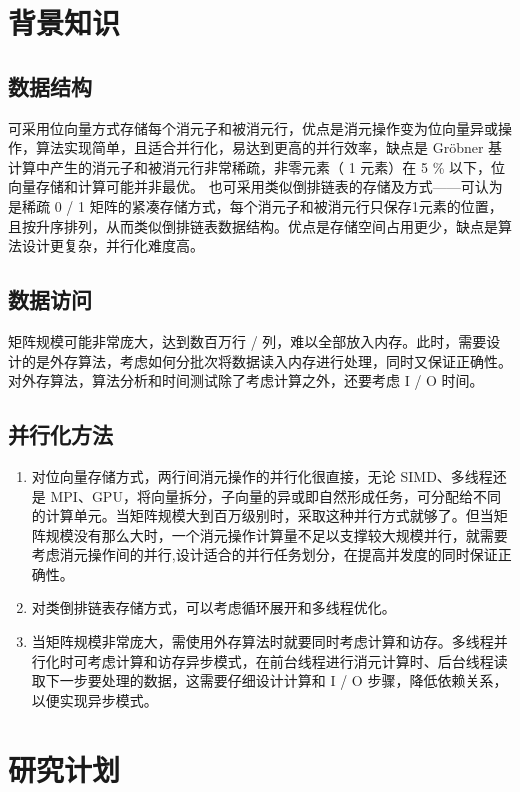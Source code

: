 \documentclass[a4paper]{article}
\begin{document}
\section{背景知识}

\subsection{数据结构}

可采用位向量方式存储每个消元子和被消元行，优点是消元操作变为位向量异或操作，算法实现简单，且适合并行化，易达到更高的并行效率，缺点是 Gröbner 基计算中产生的消元子和被消元行非常稀疏，非零元素（ 1 元素）在 5 \% 以下，位向量存储和计算可能并非最优。
也可采用类似倒排链表的存储及方式——可认为是稀疏 0 / 1 矩阵的紧凑存储方式，每个消元子和被消元行只保存1元素的位置，且按升序排列，从而类似倒排链表数据结构。优点是存储空间占用更少，缺点是算法设计更复杂，并行化难度高。

\subsection{数据访问}

矩阵规模可能非常庞大，达到数百万行 / 列，难以全部放入内存。此时，需要设计的是外存算法，考虑如何分批次将数据读入内存进行处理，同时又保证正确性。对外存算法，算法分析和时间测试除了考虑计算之外，还要考虑 I / O 时间。

\subsection{并行化方法}

\begin{enumerate}
  \item 对位向量存储方式，两行间消元操作的并行化很直接，无论 SIMD、多线程还是 MPI、GPU，将向量拆分，子向量的异或即自然形成任务，可分配给不同的计算单元。当矩阵规模大到百万级别时，采取这种并行方式就够了。但当矩阵规模没有那么大时，一个消元操作计算量不足以支撑较大规模并行，就需要考虑消元操作间的并行,设计适合的并行任务划分，在提高并发度的同时保证正确性。
  \item 对类倒排链表存储方式，可以考虑循环展开和多线程优化。
  \item 当矩阵规模非常庞大，需使用外存算法时就要同时考虑计算和访存。多线程并行化时可考虑计算和访存异步模式，在前台线程进行消元计算时、后台线程读取下一步要处理的数据，这需要仔细设计计算和 I / O 步骤，降低依赖关系，以便实现异步模式。
\end{enumerate}

\section{研究计划}
\end{document}
